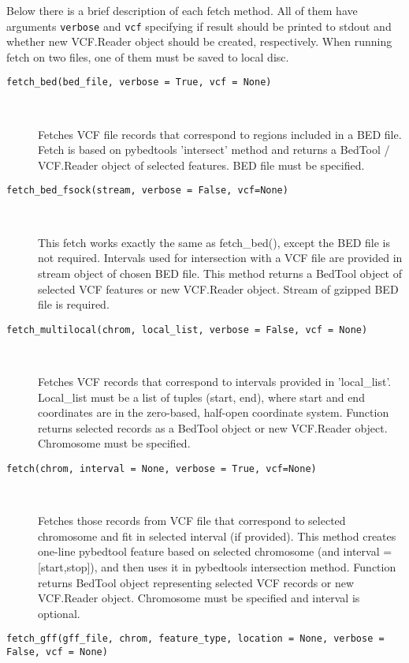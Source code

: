 \noindent Below there is a brief description of each fetch method.
All of them have arguments \verb|verbose| and \verb|vcf| specifying if result should be printed to stdout
and whether new VCF.Reader object should be created, respectively. When running fetch on two files, one of them must be
saved to local disc.

\begin{description}
  \item[\texttt{fetch\_bed(bed\_file, verbose = True, vcf = None)}] \

    Fetches VCF file records that correspond to regions included in a BED file.
    Fetch is based on pybedtools 'intersect' method and returns a BedTool / VCF.Reader object of selected features.
    BED file must be specified.

  \item[\texttt{fetch\_bed\_fsock(stream, verbose = False, vcf=None)}] \

    This fetch works exactly the same as fetch\_bed(), except the BED file is not required.
    Intervals used for intersection with a VCF file are provided in stream object of chosen BED file.
    This method returns a BedTool object of selected VCF features or new VCF.Reader object.
    Stream of gzipped BED file is required.

  \item[\texttt{fetch\_multilocal(chrom, local\_list, verbose = False, vcf = None)}] \

    Fetches VCF records that correspond to intervals provided in 'local\_list'.
    Local\_list must be a list of tuples (start, end), where start and end coordinates are in the
    zero-based, half-open coordinate system. Function returns selected records as a BedTool object
    or new VCF.Reader object. Chromosome must be specified.

  \item[\texttt{fetch(chrom, interval = None, verbose = True, vcf=None)}] \

    Fetches those records from VCF file that correspond to selected chromosome and
    fit in selected interval (if provided).
    This method creates one-line pybedtool feature based on selected chromosome (and interval = [start,stop]),
    and then uses it in pybedtools intersection method.
    Function returns BedTool object representing selected VCF records or new VCF.Reader object.
    Chromosome must be specified and interval is optional.

  \item[\texttt{fetch\_gff(gff\_file, chrom, feature\_type, location = None, verbose = False, vcf = None)}] \
  

\end{description}
